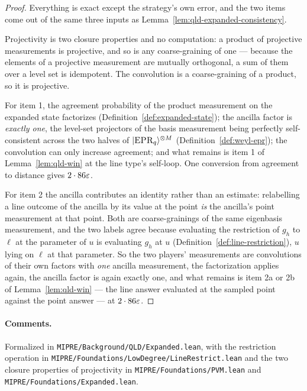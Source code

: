 \begin{proof}
\leanok
{}
Everything is exact except the strategy's own error, and the two items come out of the same
three inputs as Lemma~\ref{lem:qld-expanded-consistency}.

Projectivity is two closure properties and no computation: a product of projective measurements is
projective, and so is any coarse-graining of one --- because the elements of a projective
measurement are mutually orthogonal, a sum of them over a level set is idempotent. The convolution
is a coarse-graining of a product, so it is projective.

For item 1, the agreement probability of the product measurement on the expanded state factorizes
(Definition~\ref{def:expanded-state}); the ancilla factor is \emph{exactly one}, the level-set
projectors of the basis measurement being perfectly self-consistent across the two halves of
$|\textsc{EPR}_q\rangle^{\otimes M}$ (Definition~\ref{def:weyl-epr}); the convolution can only increase
agreement; and what remains is item 1 of Lemma~\ref{lem:qld-win} at the line type's self-loop. One
conversion from agreement to distance gives $2 \cdot 86\varepsilon$.

For item 2 the ancilla contributes an identity rather than an estimate: relabelling a line outcome
of the ancilla by its value at the point \emph{is} the ancilla's point measurement at that point.
Both are coarse-grainings of the same eigenbasis measurement, and the two labels agree because
evaluating the restriction of $g_h$ to $\ell$ at the parameter of $u$ is evaluating $g_h$ at $u$
(Definition~\ref{def:line-restriction}), $u$ lying on $\ell$ at that parameter. So the two
players' measurements are convolutions of their own factors with \emph{one} ancilla measurement,
the factorization applies again, the ancilla factor is again exactly one, and what remains is item
2a or 2b of Lemma~\ref{lem:qld-win} --- the line answer evaluated at the sampled point against the
point answer --- at $2 \cdot 86 \varepsilon$.
\end{proof}

\paragraph{Comments.} Formalized in \texttt{MIPRE/Background/QLD/Expanded.lean}, with the
restriction operation in \texttt{MIPRE/Foundations/LowDegree/LineRestrict.lean} and the two
closure properties of projectivity in \texttt{MIPRE/Foundations/PVM.lean} and
\texttt{MIPRE/Foundations/Expanded.lean}.

